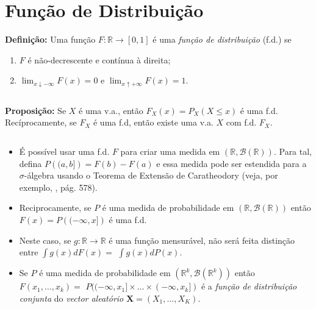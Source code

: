 \documentclass[
]{book}
\providecommand{\tightlist}{%
  \setlength{\itemsep}{0pt}\setlength{\parskip}{0pt}}
\begin{document}
\(~\)

\(~\)

\hypertarget{funuxe7uxe3o-de-distribuiuxe7uxe3o}{%
\section{Função de Distribuição}\label{funuxe7uxe3o-de-distribuiuxe7uxe3o}}

\textbf{Definição:} Uma função \(F: \mathbb{R} \longrightarrow [0,1]\) é uma \emph{função de distribuição} (f.d.) se

\begin{enumerate}
\def\labelenumi{(\roman{enumi})}
\tightlist
\item
  \(F\) é não-decrescente e contínua à direita;
\item
  \(\displaystyle\lim_{x\downarrow-\infty}F(x)=0\) e \(\displaystyle\lim_{x\uparrow+\infty}F(x)=1\).
\end{enumerate}

\(~\)

\textbf{Proposição:} Se \(X\) é uma v.a., então \(F_X(x)=P_X(X\leq x)\) é uma f.d. Recíprocamente, se \(F_X\) é uma f.d, então existe uma v.a. \(X\) com f.d. \(F_X\).

\(~\)

\begin{itemize}
\item
  É possível usar uma f.d. \(F\) para criar uma medida em \((\mathbb{R},\mathcal{B}(\mathbb{R}))\). Para tal, defina \(P\left((a,b]\right)=F(b)-F(a)\) e essa medida pode ser estendida para a \(\sigma\)-álgebra usando o Teorema de Extensão de Caratheodory (veja, por exemplo, \citet{Schervish12}, pág. 578).
\item
  Reciprocamente, se \(P\) é uma medida de probabilidade em \((\mathbb{R},\mathcal{B}(\mathbb{R}))\) então \(F(x)=P\left((-\infty,x]\right)\) é uma f.d.
\item
  Neste caso, se \(g: \mathbb{R}\longrightarrow \mathbb{R}\) é uma função mensurável, não será feita distinção entre \(\displaystyle\int g(x)dF(x)=\) \(\displaystyle\int g(x)dP(x)\).
\item
  Se \(P\) é uma medida de probabilidade em \((\mathbb{R}^k,\mathcal{B}(\mathbb{R}^k))\) então \(F(x_1,\ldots,x_k)=\) \(P((-\infty,x_1]\times \ldots\times (-\infty,x_k])\) é a \emph{função de distribuição conjunta} do \emph{vector aleatório} \(\boldsymbol{X} = (X_1,\ldots,X_K)\).
\end{itemize}

\(~\)
\end{document}
